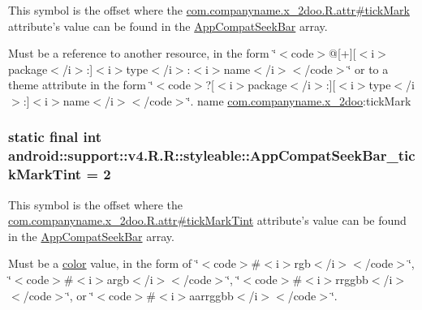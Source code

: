 This symbol is the offset where the \hyperlink{classcom_1_1companyname_1_1x__2doo_1_1_r_1_1attr_9b271e9b56cb4bf955480a269eb005a4}{com.companyname.x\_\-2doo.R.attr\#tickMark} attribute's value can be found in the \hyperlink{classandroid_1_1support_1_1v4_1_1_r_1_1styleable_7fa9b523f74ed9ed71772420c84dee04}{AppCompatSeekBar} array.

Must be a reference to another resource, in the form \char`\"{}$<$code$>$@\mbox{[}+\mbox{]}\mbox{[}$<$i$>$package$<$/i$>$:\mbox{]}$<$i$>$type$<$/i$>$:$<$i$>$name$<$/i$>$$<$/code$>$\char`\"{} or to a theme attribute in the form \char`\"{}$<$code$>$?\mbox{[}$<$i$>$package$<$/i$>$:\mbox{]}\mbox{[}$<$i$>$type$<$/i$>$:\mbox{]}$<$i$>$name$<$/i$>$$<$/code$>$\char`\"{}.  name \hyperlink{namespacecom_1_1companyname_1_1x__2doo}{com.companyname.x\_\-2doo}:tickMark \hypertarget{classandroid_1_1support_1_1v4_1_1_r_1_1styleable_201e2cc7cfcab0b7c77dd7867a265808}{
\subsubsection[{AppCompatSeekBar\_\-tickMarkTint}]{\setlength{\rightskip}{0pt plus 5cm}static final int android::support::v4.R.R::styleable::AppCompatSeekBar\_\-tickMarkTint = 2}}
\label{classandroid_1_1support_1_1v4_1_1_r_1_1styleable_201e2cc7cfcab0b7c77dd7867a265808}


This symbol is the offset where the \hyperlink{classcom_1_1companyname_1_1x__2doo_1_1_r_1_1attr_8468cf7dcc47f0da7291e4e7f59e235d}{com.companyname.x\_\-2doo.R.attr\#tickMarkTint} attribute's value can be found in the \hyperlink{classandroid_1_1support_1_1v4_1_1_r_1_1styleable_7fa9b523f74ed9ed71772420c84dee04}{AppCompatSeekBar} array.

Must be a \hyperlink{classandroid_1_1support_1_1v4_1_1_r_1_1color}{color} value, in the form of \char`\"{}$<$code$>$\#$<$i$>$rgb$<$/i$>$$<$/code$>$\char`\"{}, \char`\"{}$<$code$>$\#$<$i$>$argb$<$/i$>$$<$/code$>$\char`\"{}, \char`\"{}$<$code$>$\#$<$i$>$rrggbb$<$/i$>$$<$/code$>$\char`\"{}, or \char`\"{}$<$code$>$\#$<$i$>$aarrggbb$<$/i$>$$<$/code$>$\char`\"{}. 

